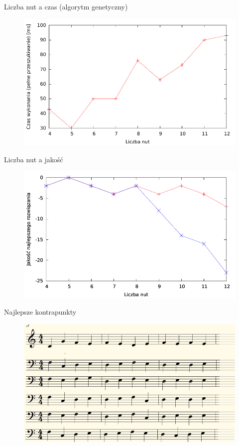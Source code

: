 \documentclass{beamer}
\begin{document}
\begin{frame}{Liczba nut a czas (algorytm genetyczny)}
	\begin{figure}
	   \includegraphics[scale=0.7]{images/liczba_nut_a_czas_AG.pdf}
	\end{figure}
\end{frame}

\begin{frame}{Liczba nut a jakość}
	\begin{figure}
	   \includegraphics[scale=0.7]{images/liczba_nut_a_jakosc.pdf}
	\end{figure}
\end{frame}

\begin{frame}{Najlepsze kontrapunkty}
	\begin{figure}
	   \includegraphics[scale=0.4]{images/najlepsze_kontrapunkty.png}
	\end{figure}
\end{frame}
\end{document}

